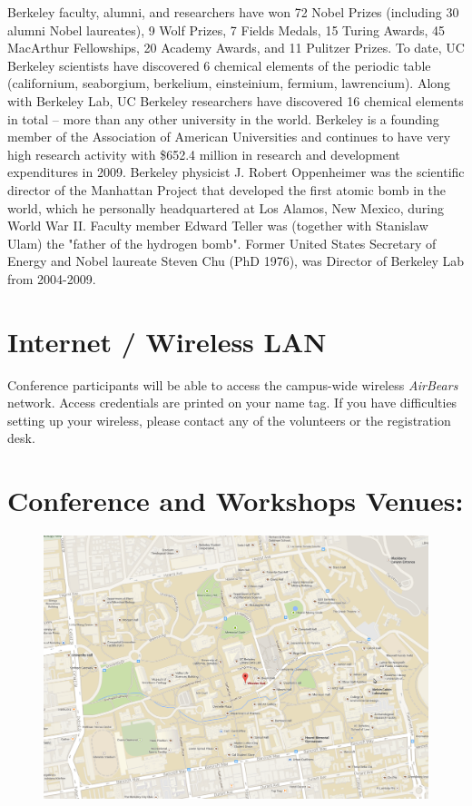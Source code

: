 Berkeley faculty, alumni, and researchers have won 72 Nobel Prizes (including 30 alumni Nobel laureates), 9 Wolf Prizes, 7 Fields Medals, 15 Turing Awards, 45 MacArthur Fellowships, 20 Academy Awards, and 11 Pulitzer Prizes. To date, UC Berkeley scientists have discovered 6 chemical elements of the periodic table (californium, seaborgium, berkelium, einsteinium, fermium, lawrencium). Along with Berkeley Lab, UC Berkeley researchers have discovered 16 chemical elements in total – more than any other university in the world. Berkeley is a founding member of the Association of American Universities and continues to have very high research activity with \$652.4 million in research and development expenditures in 2009. Berkeley physicist J. Robert Oppenheimer was the scientific director of the Manhattan Project that developed the first atomic bomb in the world, which he personally headquartered at Los Alamos, New Mexico, during World War II. Faculty member Edward Teller was (together with Stanislaw Ulam) the "father of the hydrogen bomb". Former United States Secretary of Energy and Nobel laureate Steven Chu (PhD 1976), was Director of Berkeley Lab from 2004-2009.

\section{Internet / Wireless LAN}

Conference participants will be able to access the campus-wide wireless \emph{AirBears} network. Access credentials are printed on your name tag. If you have difficulties setting up your wireless, please contact any of the volunteers or the registration desk.



\clearpage
{} \section{Conference and Workshops Venues:}
\begin{figure}[h!]
\includegraphics[width=\linewidth]{local_img/maps/wheeler_hall}
\end{figure}

